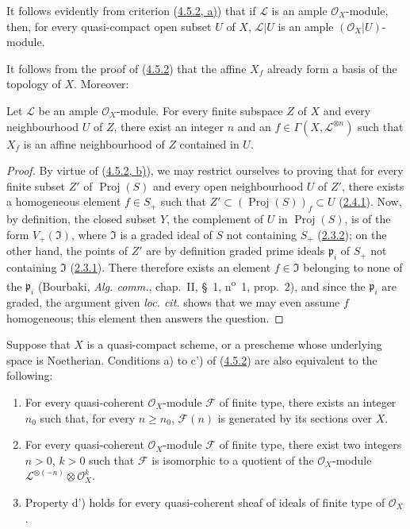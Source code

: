 It follows evidently from criterion (\hyperref[II.4.5.2]{4.5.2, a)}) that if
$\mathcal{L}$ is an ample $\mathcal{O}_X$-module, then, for every quasi-compact open subset
$U$ of $X$, $\mathcal{L}|U$ is an ample $(\mathcal{O}_X|U)$-module.

It follows from the proof of (\hyperref[II.4.5.2]{4.5.2}) that the
affine $X_f$ already form a basis of the topology of $X$. Moreover:

\begin{corollary}[4.5.4]
\label{II.4.5.4}
Let $\mathcal{L}$ be an ample $\mathcal{O}_X$-module. For every finite subspace
$Z$ of $X$ and every neighbourhood $U$ of $Z$, there exist an integer $n$ and an
$f\in\Gamma(X,\mathcal{L}^{\otimes n})$ such that $X_f$ is an affine
neighbourhood of $Z$ contained in $U$.
\end{corollary}

\begin{proof}

By virtue of (\hyperref[II.4.5.2]{4.5.2, b)}), we may restrict ourselves to proving
that for every finite subset $Z'$ of $\operatorname{Proj}(S)$ and every
open neighbourhood $U$ of $Z'$, there exists a homogeneous element $f\in S_+$ such
that $Z'\subset(\operatorname{Proj}(S))_f\subset U$
(\hyperref[II.2.4.1]{2.4.1}). Now, by definition, the closed subset $Y$,
the complement of $U$ in $\operatorname{Proj}(S)$, is of the form
$V_+(\mathfrak{I})$, where $\mathfrak{I}$ is a graded ideal of $S$ not
containing $S_+$ (\hyperref[II.2.3.2]{2.3.2}); on the other hand, the
points of $Z'$ are by definition graded prime ideals
$\mathfrak{p}_i$ of $S_+$ not containing $\mathfrak{I}$
(\hyperref[II.2.3.1]{2.3.1}). There therefore exists an element
$f\in\mathfrak{I}$ belonging to none of the $\mathfrak{p}_i$ (Bourbaki,
\emph{Alg. comm.}, chap.~II, \S~1, n\textsuperscript{o}~1, prop.~2), and since
the $\mathfrak{p}_i$ are graded, the argument given \emph{loc. cit.}
shows that we may even assume $f$ homogeneous; this element then answers the
question.
\end{proof}

\begin{proposition}[4.5.5]
\label{II.4.5.5}
Suppose that $X$ is a quasi-compact scheme, or a prescheme whose underlying
space is Noetherian. Conditions a) to c') of
(\hyperref[II.4.5.2]{4.5.2}) are also equivalent to the following:
\begin{enumerate}
  \item[\rm{d)}] For every quasi-coherent $\mathcal{O}_X$-module
  $\mathcal{F}$ of finite type, there exists an integer $n_0$ such that, for every
  $n\geq n_0$, $\mathcal{F}(n)$ is generated by its sections over
  $X$.
  \item[\rm{d')}] For every quasi-coherent $\mathcal{O}_X$-module
  $\mathcal{F}$ of finite type, there exist two integers $n>0$, $k>0$ such that
  $\mathcal{F}$ is isomorphic to a quotient of the $\mathcal{O}_X$-module
  $\mathcal{L}^{\otimes(-n)}\otimes\mathcal{O}_X^k$.
  \item[\rm{d'')}] Property d') holds for every quasi-coherent sheaf of
  ideals of finite type of $\mathcal{O}_X$.
\end{enumerate}
\end{proposition}

